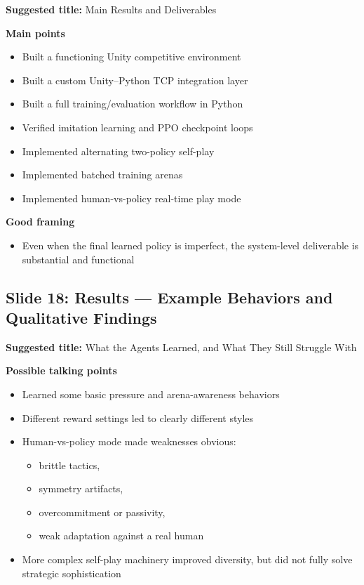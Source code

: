\documentclass[11pt]{article}
\begin{document}
\textbf{Suggested title:} Main Results and Deliverables

\textbf{Main points}
\begin{itemize}
    \item Built a functioning Unity competitive environment
    \item Built a custom Unity--Python TCP integration layer
    \item Built a full training/evaluation workflow in Python
    \item Verified imitation learning and PPO checkpoint loops
    \item Implemented alternating two-policy self-play
    \item Implemented batched training arenas
    \item Implemented human-vs-policy real-time play mode
\end{itemize}

\textbf{Good framing}
\begin{itemize}
    \item Even when the final learned policy is imperfect, the system-level deliverable is substantial and functional
\end{itemize}

\subsection*{Slide 18: Results --- Example Behaviors and Qualitative Findings}

\textbf{Suggested title:} What the Agents Learned, and What They Still Struggle With

\textbf{Possible talking points}
\begin{itemize}
    \item Learned some basic pressure and arena-awareness behaviors
    \item Different reward settings led to clearly different styles
    \item Human-vs-policy mode made weaknesses obvious:
    \begin{itemize}
        \item brittle tactics,
        \item symmetry artifacts,
        \item overcommitment or passivity,
        \item weak adaptation against a real human
    \end{itemize}
    \item More complex self-play machinery improved diversity, but did not fully solve strategic sophistication
\end{itemize}
\end{document}
